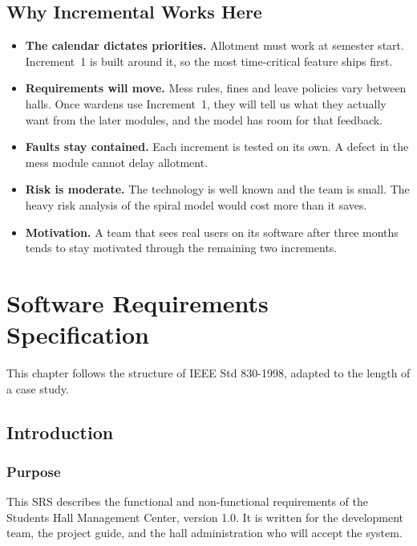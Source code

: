 \documentclass[11pt,a4paper]{report}
\begin{document}
\section{Why Incremental Works Here}
\begin{itemize}
  \item \textbf{The calendar dictates priorities.} Allotment must work at semester start. Increment~1 is built around it, so the most time-critical feature ships first.
  \item \textbf{Requirements will move.} Mess rules, fines and leave policies vary between halls. Once wardens use Increment~1, they will tell us what they actually want from the later modules, and the model has room for that feedback.
  \item \textbf{Faults stay contained.} Each increment is tested on its own. A defect in the mess module cannot delay allotment.
  \item \textbf{Risk is moderate.} The technology is well known and the team is small. The heavy risk analysis of the spiral model would cost more than it saves.
  \item \textbf{Motivation.} A team that sees real users on its software after three months tends to stay motivated through the remaining two increments.
\end{itemize}

\chapter{Software Requirements Specification}
This chapter follows the structure of IEEE Std 830-1998, adapted to the length of a case study.

\section{Introduction}
\subsection{Purpose}
This SRS describes the functional and non-functional requirements of the Students Hall Management Center, version 1.0. It is written for the development team, the project guide, and the hall administration who will accept the system.
\end{document}
